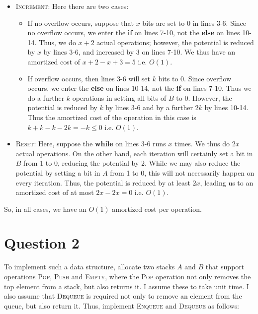 \documentclass[a4paper,11pt]{scrartcl}
\begin{document}
\begin{itemize}
    \item \textsc{Increment}: Here there are two cases:
        \begin{itemize}
            \item If no overflow occurs, suppose that $x$ bits are set to $0$ in lines 3-6. Since no overflow occurs, we enter the \textbf{if} on lines 7-10, not the \textbf{else} on lines 10-14. Thus, we do $x + 2$ actual operations; however, the potential is reduced by $x$ by lines 3-6, and increased by 3 on lines 7-10. We thus have an amortized cost of $x + 2 - x + 3 = 5$ i.e. $O(1)$.
            \item If overflow occurs, then lines 3-6 will set $k$ bits to $0$. Since overflow occurs, we enter the \textbf{else} on lines 10-14, not the \textbf{if} on lines 7-10. Thus we do a further $k$ operations in setting all bits of $B$ to $0$. However, the potential is reduced by $k$ by lines 3-6 and by a further $2k$ by lines 10-14. Thus the amortized cost of the operation in this case is $k + k - k - 2k = -k \leq 0$ i.e. $O(1)$.
        \end{itemize}
    \item \textsc{Reset}: Here, suppose the \textbf{while} on lines 3-6 runs $x$ times. We thus do $2 x$ actual operations. On the other hand, each iteration will certainly set a bit in $B$ from 1 to 0, reducing the potential by 2. While we may also reduce the potential by setting a bit in $A$ from 1 to 0, this will not necessarily happen on every iteration. Thus, the potential is reduced by at least $2 x$, leading us to an amortized cost of at most $2x - 2x = 0$ i.e. $O(1)$.
\end{itemize}

So, in all cases, we have an $O(1)$ amortized cost per operation.

\section{Question 2}

To implement such a data structure, allocate two stacks $A$ and $B$ that support operations \textsc{Pop}, \textsc{Push} and \textsc{Empty}, where the \textsc{Pop} operation not only removes the top element from a stack, but also returns it. I assume these to take unit time. I also assume that \textsc{Dequeue} is required not only to remove an element from the queue, but also return it. Thus, implement \textsc{Enqueue} and \textsc{Dequeue} as follows:
\end{document}
